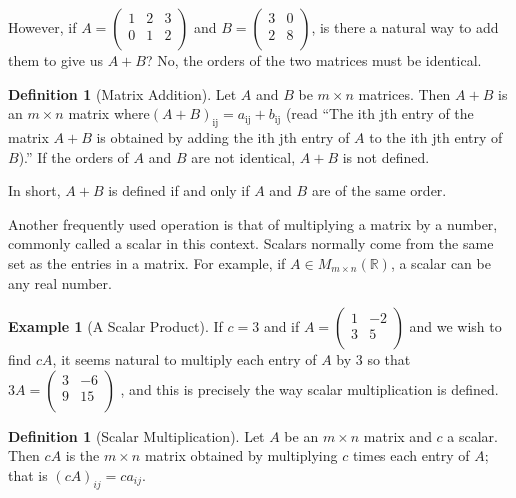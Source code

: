 \documentclass[10pt,]{book}
\theoremstyle{plain}
\theoremstyle{definition}
\newtheorem{definition}[theorem]{Definition}
\theoremstyle{definition}
\theoremstyle{definition}
\newtheorem{example}[theorem]{Example}
\theoremstyle{definition}
\begin{document}
However, if \(A=\left(
\begin{array}{ccc}
 1 & 2 & 3 \\
 0 & 1 & 2 \\
\end{array}
\right)\) and \(B = \left(
\begin{array}{cc}
 3 & 0 \\
 2 & 8 \\
\end{array}
\right)\), is there a natural way to add them to give us \(A+B\)? No, the orders of the two matrices must be identical.%
\begin{definition}[Matrix Addition]\label{def-matrix-addition}
Let \(A\) and \(B\) be \(m\times n\) matrices. Then \(A+B\) is an \(m\times n\) matrix where\((A
+ B)_{\text{ij}} = a_{\text{ij}} + b_{\text{ij}}\) (read ``The ith jth entry of the matrix \(A + B\) is obtained by adding the ith jth entry of \(A\) to the ith jth entry of \(B\)).'' If the orders of \(A\) and \(B\) are not identical, \(A+B\) is not defined.%
\end{definition}
\par
 In short,  \(A + B\) is defined if and only if \(A\) and \(B\) are of the same order.%
\par
Another frequently used operation is that of multiplying a matrix by a number, commonly called a scalar in this context. Scalars normally come from the same set as the entries in a matrix. For example, if \(A\in M_{m\times n}(\mathbb{R})\), a scalar can be any real number.%
\begin{example}[A Scalar Product]\label{ex-scalar-mult}
 If \(c = 3\) and if \(A =\left(
\begin{array}{cc}
 1 & -2 \\
 3 & 5 \\
\end{array}
\right)\) and we wish to find \(c A\), it seems natural to multiply each entry of \(A\) by 3 so that \(3 A =\left(
\begin{array}{cc}
 3 & -6 \\
 9 & 15 \\
\end{array}
\right)\) , and this is precisely the way scalar multiplication is defined.%
\end{example}
\begin{definition}[Scalar Multiplication]\label{def-scalar-multiplication}
Let \(A\) be an \(m \times  n\) matrix and \(c\) a scalar. Then \(c A\) is the \(m\times n\) matrix
obtained by multiplying \(c\) times each entry of \(A\); that is \((c A)_{ij} = c a_{ij}\).%
\end{definition}
\typeout{************************************************}
\typeout{************************************************}
\end{document}
